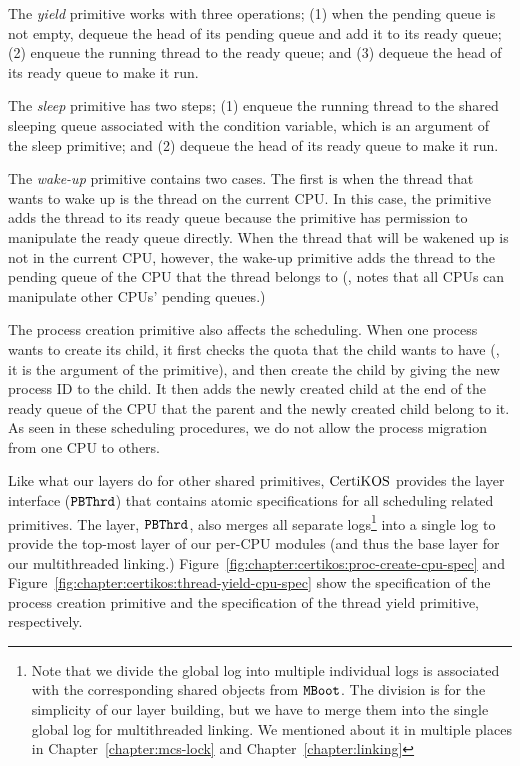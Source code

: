 The \textit{yield} primitive works with three operations; 
(1) when the pending queue is not empty, dequeue the head of its pending queue and add it to its ready queue;
(2) enqueue the running thread to the ready queue; and 
(3) dequeue the head of its ready queue to make it run.

The \textit{sleep} primitive has two steps;
(1) enqueue the running thread to the shared sleeping queue associated with the condition variable, which is an argument of the sleep primitive; and
(2) dequeue the head of its ready queue to make it run.

The \textit{wake-up} primitive contains two cases. 
The first is when the thread that wants to wake up is the thread on the current CPU. 
In this case, the primitive adds the thread to its ready queue because the primitive has permission to manipulate the ready queue directly.
When the thread that will be wakened up is not in the current CPU, however, the wake-up primitive adds the thread to the pending queue of the CPU
that the thread belongs to (\ie, notes that all CPUs can manipulate other CPUs' pending queues.) 


The process creation primitive also affects the scheduling.
When one process wants to create its child, 
it first checks the quota that the child wants to have (\ie, it is the argument of the primitive), 
and then create the child by giving the new process ID to the child. 
It then adds the newly created child at the end of the ready queue of the CPU that the parent and the newly created child belong to it. 
As seen in these scheduling procedures, we do not allow the process migration from one CPU to others.

Like what our layers do for other shared primitives, $\mathrm{CertiKOS}$ provides the layer interface (${\mathrm{\texttt{PBThrd}}}$)
that contains atomic specifications for all scheduling related primitives. 
The layer, ${\mathrm{\texttt{PBThrd}}}$, also merges all separate logs\footnote{Note that we divide the global log into multiple individual logs is associated with the corresponding shared objects from ${\mathrm{\texttt{MBoot}}}$. The division is for the simplicity of our layer building, but we have to merge them into the single global log for multithreaded linking. We mentioned about it in multiple places in Chapter~\ref{chapter:mcs-lock} and Chapter~\ref{chapter:linking}} 
into a single log to provide the top-most layer of our per-CPU modules (and thus the base layer for our multithreaded linking.)
Figure~\ref{fig:chapter:certikos:proc-create-cpu-spec} and Figure~\ref{fig:chapter:certikos:thread-yield-cpu-spec} show the specification of the process creation primitive and the specification of the thread yield primitive, respectively.

